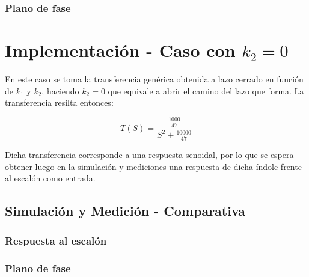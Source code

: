 \documentclass{article}
\begin{document}
\subsubsection{Plano de fase}


\section{Implementación - Caso con $k_2 = 0$}

En este caso se toma la transferencia genérica obtenida a lazo cerrado en función de $k_1$ y $k_2$, haciendo $k_2 = 0$ que equivale a abrir el camino del lazo que forma. La transferencia resilta entonces:

\[
T(S) = \frac{\frac{1000}{47}}{S^2 + \frac{10000}{47}}
\]

Dicha transferencia corresponde a una respuesta senoidal, por lo que se espera obtener luego en la simulación y mediciones una respuesta de dicha índole frente al escalón como entrada.

\subsection{Simulación y Medición - Comparativa}

\subsubsection{Respuesta al escalón}

\subsubsection{Plano de fase}

\end{document}
